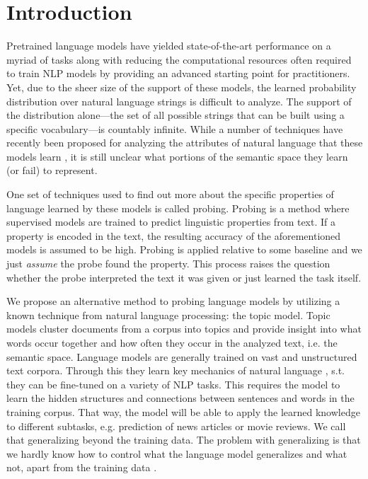 \chapter{Introduction}

Pretrained language models have yielded state-of-the-art performance on a myriad of tasks along with reducing the computational resources often required to train NLP models by providing an advanced starting point for practitioners. Yet, due to the sheer size of the support of these models, the learned probability distribution over natural language strings is difficult to analyze. The support of the distribution alone---the set of all possible strings that can be built using a specific vocabulary---is countably infinite. While a number of techniques have recently been proposed for analyzing the attributes of natural language that these models learn \cite{desintpro, alain2016understanding, pandit2021probing, koto2021discourse, belinkov2022probing}, it is still unclear what portions of the semantic space they learn (or fail) to represent.

One set of techniques used to find out more about the specific properties of language learned by these models is called probing. Probing is a method where supervised models are trained to predict linguistic properties from text. If a property is encoded in the text, the resulting accuracy of the aforementioned models is assumed to be high. Probing is applied relative to some baseline and we just \textit{assume} the probe found the property. This process raises the question whether the probe interpreted the text it was given or just learned the task itself. \cite{desintpro}

We propose an alternative method to probing language models by utilizing a known technique from natural language processing: the topic model. Topic models cluster documents from a corpus into topics and provide insight into what words occur together and how often they occur in the analyzed text, i.e. the semantic space. Language models are generally trained on vast and unstructured text corpora. Through this they learn key mechanics of natural language \cite{rytting2021leveraging}, s.t. they can be fine-tuned on a variety of NLP tasks. This requires the model to learn the hidden structures and connections between sentences and words in the training corpus. That way, the model will be able to apply the learned knowledge to different subtasks, e.g. prediction of news articles or movie reviews. We call that generalizing beyond the training data. The problem with generalizing is that we hardly know how to control what the language model generalizes and what not, apart from the training data \cite{MarasovicGradient2018NLP}. 

